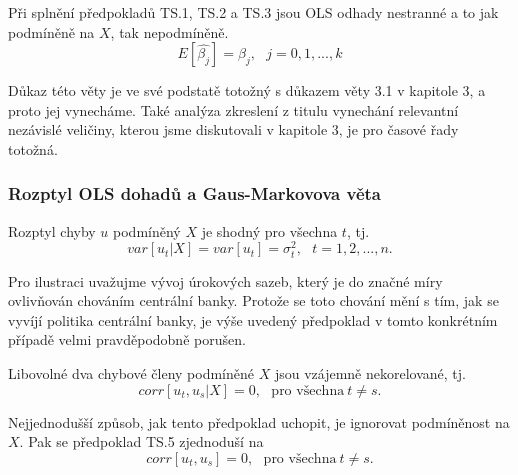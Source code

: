 \begin{theorem}
Při splnění předpokladů TS.1, TS.2 a TS.3 jsou OLS odhady 
nestranné a to jak podmíněně na $X$, tak nepodmíněně.
\begin{equation}
E[\hat{\beta_j}] = \beta_j, ~~~ j = 0, 1, ..., k
\end{equation}

\raggedleft{$\clubsuit$}
\end{theorem}

Důkaz této věty je ve své podstatě totožný s důkazem věty 3.1 
v kapitole 3, a proto jej vynecháme. Také analýza zkreslení z 
titulu vynechání relevantní nezávislé veličiny, kterou jsme 
diskutovali v kapitole 3, je pro časové řady totožná.

\subsubsection{Rozptyl OLS dohadů a Gaus-Markovova věta}

\begin{assumption}[TS.4 - homoskedasticita]
Rozptyl chyby $u$ podmíněný $X$ je shodný pro všechna $t$, tj.
\begin{equation}
var[u_t|X] = var[u_t] = \sigma^2_t, ~~~ t = 1, 2, ..., n.
\end{equation}

\raggedleft{$\clubsuit$}
\end{assumption}

Pro ilustraci uvažujme vývoj úrokových sazeb, který je do značné míry 
ovlivňován chováním centrální banky. Protože se toto chování 
mění s tím, jak se vyvíjí politika centrální banky, je výše uvedený 
předpoklad v tomto konkrétním případě velmi pravděpodobně porušen.

\begin{assumption}
Libovolné dva chybové členy podmíněné $X$ jsou vzájemně nekorelované, tj.
\begin{equation}
corr[u_t, u_s|X] = 0, ~~~ \text{pro všechna} ~ t \ne s.
\end{equation}

\raggedleft{$\clubsuit$}
\end{assumption}

Nejjednodušší způsob, jak tento předpoklad uchopit, je ignorovat 
podmíněnost na $X$. Pak se předpoklad TS.5 zjednoduší na
\begin{equation}
corr[u_t, u_s] = 0, ~~~ \text{pro všechna} ~ t \ne s.
\end{equation}

